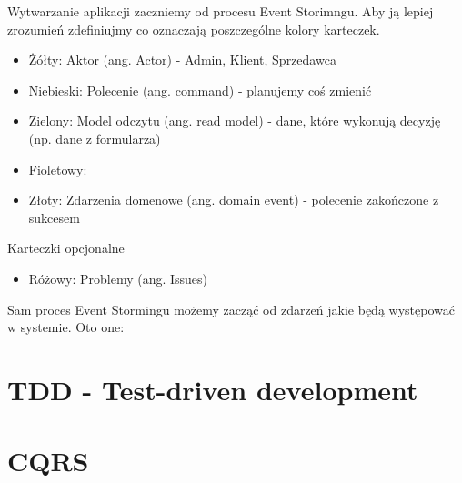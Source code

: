 \documentclass{article}
\begin{document}
      Wytwarzanie aplikacji zaczniemy od procesu Event Storimngu. Aby ją lepiej zrozumień zdefiniujmy co oznaczają poszczególne kolory karteczek.
      \begin{itemize}
            \item Żółty: Aktor (ang. Actor) - Admin, Klient, Sprzedawca
            \item Niebieski: Polecenie (ang. command) - planujemy coś zmienić
            \item Zielony: Model odczytu (ang. read model) - dane, które wykonują decyzję (np. dane z formularza)
            \item Fioletowy: 
            \item Złoty: Zdarzenia domenowe (ang. domain event) - polecenie zakończone z sukcesem
      \end{itemize}
      Karteczki opcjonalne
      \begin{itemize}
            \item Różowy: Problemy (ang. Issues)
      \end{itemize}

      Sam proces Event Stormingu możemy zacząć od zdarzeń jakie będą występować w systemie. Oto one:

      
\section{TDD - Test-driven development}

\section{CQRS}
\end{document}
